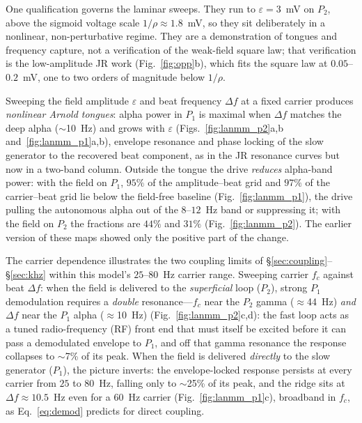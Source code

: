 \documentclass[11pt,a4paper]{article}
\providecommand{\DIFdeltex}[1]{{\protect\color{red} \scriptsize #1}} %
\providecommand{\DIFaddbegin}{} %
\providecommand{\DIFdelbegin}{} %
\providecommand{\DIFdelend}{} %
\providecommand{\DIFdel}[1]{\texorpdfstring{\DIFdeltex{#1}}{}} %
\begin{document}
One qualification governs the laminar sweeps. They run to $\varepsilon=3$~mV on $P_2$,
above the sigmoid voltage scale $1/\rho\approx1.8$~mV, so they sit deliberately in a
nonlinear, non-perturbative regime. They are a demonstration of tongues and frequency
capture, not a verification of the weak-field square law; that verification is the
low-amplitude JR work (Fig.~\ref{fig:opp}b), which fits the square law at
$0.05$--$0.2$~mV, one to two orders of magnitude below $1/\rho$.

Sweeping the field amplitude $\varepsilon$ and beat frequency $\Delta f$ at a fixed
carrier produces \emph{nonlinear Arnold tongues}: alpha power in $P_1$ is maximal
when $\Delta f$ matches the deep alpha ($\sim$10~Hz) and grows with $\varepsilon$
(Figs.~\ref{fig:lanmm_p2}a,b and~\ref{fig:lanmm_p1}a,b), envelope resonance and
phase locking of the slow generator to the recovered beat component, as in the
JR resonance curves but now in a two-band column. Outside the tongue the drive
\emph{reduces} alpha-band power: with the field on $P_1$, $95\%$ of the amplitude--beat
grid and $97\%$ of the carrier--beat grid lie below the field-free baseline
(Fig.~\ref{fig:lanmm_p1}), the drive pulling the autonomous alpha out of the $8$--$12$~Hz
band or suppressing it; with the field on $P_2$ the fractions are $44\%$ and $31\%$
(Fig.~\ref{fig:lanmm_p2}).
\DIFdelbegin \DIFdel{The earlier version of these maps showed only the positive
part of the change.
}\DIFdelend 

The carrier dependence illustrates the two coupling
limits of \S\ref{sec:coupling}--\S\ref{sec:khz} within this model's $25$--$80$~Hz carrier
range. Sweeping carrier $f_c$ against
beat $\Delta f$: when the field is delivered to the \emph{superficial} loop
($P_2$), strong $P_1$ demodulation requires a \emph{double} resonance---$f_c$ near
the $P_2$ gamma ($\approx$44~Hz) \emph{and} $\Delta f$ near the $P_1$ alpha
($\approx$10~Hz) (Fig.~\ref{fig:lanmm_p2}c,d): the fast loop acts as a tuned
radio-frequency (RF) front end that must itself be excited before it can pass a demodulated
envelope to $P_1$, and off that gamma resonance the response collapses to
$\sim$7\% of its peak. When the field is delivered \emph{directly} to the slow
generator ($P_1$), the picture inverts: the envelope-locked response persists at
every carrier from $25$ to $80$~Hz, falling only to $\sim$25\% of its peak, and the
ridge sits at $\Delta f\!\approx\!10.5$~Hz even for a $60$~Hz carrier
(Fig.~\ref{fig:lanmm_p1}c), broadband in $f_c$, as Eq.~\eqref{eq:demod} predicts for
direct coupling.
\DIFaddbegin 
\end{document}
